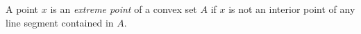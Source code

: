 A point $x$ is an \emph{extreme point} of a convex set $A$ if $x$ is not an interior point of any line segment contained in $A$.
